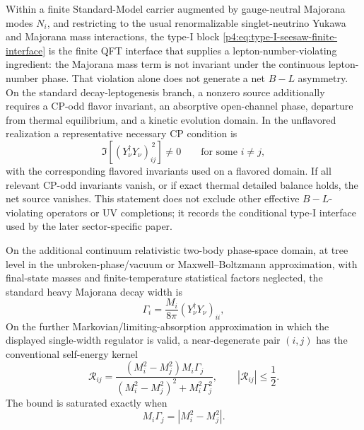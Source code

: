 \documentclass[12pt,a4paper]{article}
\begin{document}
\begin{theorem}
\label{p4:thm:minimal-finite-temperature-seesaw-interface}
\leavevmode\par\noindent
Within a finite Standard-Model carrier augmented by gauge-neutral Majorana
modes \(N_i\), and restricting to the usual renormalizable singlet-neutrino
Yukawa and Majorana mass interactions, the type-I block
\eqref{p4:eq:type-I-seesaw-finite-interface} is the finite QFT interface that
supplies a lepton-number-violating ingredient: the Majorana mass term is not
invariant under the continuous lepton-number phase.  That violation alone
does not generate a net \(B-L\) asymmetry.  On the standard decay-leptogenesis
branch, a nonzero source additionally requires a CP-odd flavor invariant, an
absorptive open-channel phase, departure from thermal equilibrium, and a
kinetic evolution domain.  In the unflavored realization a representative
necessary CP condition is
\begin{equation}
\label{p4:eq:seesaw-cp-odd-source-condition}
\Im\!\left[(Y_\nu^\dagger Y_\nu)_{ij}^{\,2}\right]\ne0
\qquad\text{for some }i\ne j,
\end{equation}
with the corresponding flavored invariants used on a flavored domain.  If all
relevant CP-odd invariants vanish, or if exact thermal detailed balance holds,
the net source vanishes.  This statement does not exclude other effective
\(B-L\)-violating operators or UV completions; it records the conditional
type-I interface used by the later sector-specific paper.

On the additional continuum relativistic two-body phase-space domain, at tree
level in the unbroken-phase/vacuum or Maxwell--Boltzmann approximation, with
final-state masses and finite-temperature statistical factors neglected, the
standard heavy Majorana decay width is
\begin{equation}
\label{p4:eq:heavy-majorana-width}
\Gamma_i
=
\frac{M_i}{8\pi}(Y_\nu^\dagger Y_\nu)_{ii},
\end{equation}
On the further Markovian/limiting-absorption approximation in which the
displayed single-width regulator is valid, a near-degenerate pair
\((i,j)\) has the conventional self-energy kernel
\begin{equation}
\label{p4:eq:resonant-self-energy-kernel}
\mathcal R_{ij}
=
\frac{(M_i^2-M_j^2)M_i\Gamma_j}
{(M_i^2-M_j^2)^2+M_i^2\Gamma_j^2},
\qquad
|\mathcal R_{ij}|\le\frac12 .
\end{equation}
The bound is saturated exactly when
\begin{equation}
\label{p4:eq:resonant-width-optimality}
M_i\Gamma_j=|M_i^2-M_j^2|.
\end{equation}
\end{theorem}
\end{document}

